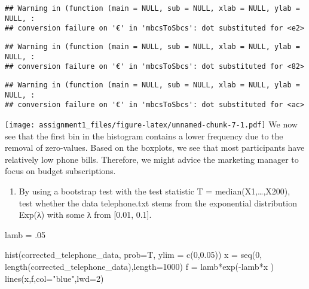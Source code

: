 \documentclass[
]{article}
\newenvironment{Shaded}{\begin{snugshade}}{\end{snugshade}}
\newcommand{\AttributeTok}[1]{\textcolor[rgb]{0.77,0.63,0.00}{#1}}
\newcommand{\DecValTok}[1]{\textcolor[rgb]{0.00,0.00,0.81}{#1}}
\newcommand{\FloatTok}[1]{\textcolor[rgb]{0.00,0.00,0.81}{#1}}
\newcommand{\FunctionTok}[1]{\textcolor[rgb]{0.00,0.00,0.00}{#1}}
\newcommand{\NormalTok}[1]{#1}
\newcommand{\OtherTok}[1]{\textcolor[rgb]{0.56,0.35,0.01}{#1}}
\newcommand{\SpecialCharTok}[1]{\textcolor[rgb]{0.00,0.00,0.00}{#1}}
\newcommand{\StringTok}[1]{\textcolor[rgb]{0.31,0.60,0.02}{#1}}
\providecommand{\tightlist}{%
  \setlength{\itemsep}{0pt}\setlength{\parskip}{0pt}}
\begin{document}
\begin{verbatim}
## Warning in (function (main = NULL, sub = NULL, xlab = NULL, ylab = NULL, :
## conversion failure on '€' in 'mbcsToSbcs': dot substituted for <e2>
\end{verbatim}

\begin{verbatim}
## Warning in (function (main = NULL, sub = NULL, xlab = NULL, ylab = NULL, :
## conversion failure on '€' in 'mbcsToSbcs': dot substituted for <82>
\end{verbatim}

\begin{verbatim}
## Warning in (function (main = NULL, sub = NULL, xlab = NULL, ylab = NULL, :
## conversion failure on '€' in 'mbcsToSbcs': dot substituted for <ac>
\end{verbatim}

\texttt{[image: assignment1\_files/figure-latex/unnamed-chunk-7-1.pdf]}
We now see that the first bin in the histogram contains a lower
frequency due to the removal of zero-values. Based on the boxplots, we
see that most participants have relatively low phone bills. Therefore,
we might advice the marketing manager to focus on budget subscriptions.

\begin{enumerate}
\def\labelenumi{\alph{enumi})}
\setcounter{enumi}{1}
\tightlist
\item
  By using a bootstrap test with the test statistic T =
  median(X1,\ldots,X200), test whether the data telephone.txt stems from
  the exponential distribution Exp(λ) with some λ from {[}0.01, 0.1{]}.
\end{enumerate}

\begin{Shaded}
\begin{Highlighting}[]
\NormalTok{lamb }\OtherTok{=}\NormalTok{ .}\DecValTok{05}

\FunctionTok{hist}\NormalTok{(corrected\_telephone\_data, }\AttributeTok{prob=}\NormalTok{T, }\AttributeTok{ylim =} \FunctionTok{c}\NormalTok{(}\DecValTok{0}\NormalTok{,}\FloatTok{0.05}\NormalTok{))}
\NormalTok{x }\OtherTok{=} \FunctionTok{seq}\NormalTok{(}\DecValTok{0}\NormalTok{, }\FunctionTok{length}\NormalTok{(corrected\_telephone\_data),}\AttributeTok{length=}\DecValTok{1000}\NormalTok{)}
\NormalTok{f }\OtherTok{=}\NormalTok{ lamb}\SpecialCharTok{*}\FunctionTok{exp}\NormalTok{(}\SpecialCharTok{{-}}\NormalTok{lamb}\SpecialCharTok{*}\NormalTok{x )}
\FunctionTok{lines}\NormalTok{(x,f,}\AttributeTok{col=}\StringTok{"blue"}\NormalTok{,}\AttributeTok{lwd=}\DecValTok{2}\NormalTok{)}
\end{Highlighting}
\end{Shaded}
\end{document}
